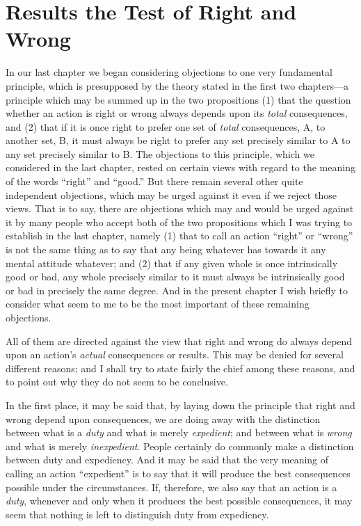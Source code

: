 
\author{G. E. Moore}
\chapter{Results the Test of Right and Wrong}


In our last chapter we began considering objections to one
very fundamental principle, which is presupposed by the theory stated
in the first two chapters---a principle which may be summed up in the
two propositions (1) that the question whether an action is right or
wrong always depends upon its \textit{total} consequences, and (2)
that if it is once right to prefer one set of \textit{total}
consequences, A, to another set, B, it must always be right to
prefer any set precisely similar to A to any set precisely similar to
B. The objections to this principle, which we considered in the last
chapter, rested on certain views with regard to the meaning of the
words ``right'' and ``good.'' But there remain several other quite
independent objections, which may be urged against it  even
if we reject those views. That is to say, there are objections which
may and would be urged against it by many people who accept both of
the two propositions which I was trying to establish in the last
chapter, namely (1) that to call an action ``right'' or ``wrong'' is
not the same thing as to say that any being whatever has towards it
any mental attitude whatever; and (2) that if any given whole is once
intrinsically good or bad, any whole precisely similar to it must
always be intrinsically good or bad in precisely the same degree. And
in the present chapter I wish briefly to consider what seem to me to
be the most important of these remaining objections.

All of them are directed against the view that right and wrong do
always depend upon an action's \textit{actual} consequences or
results. This may be denied for several different reasons; and I shall
try to state fairly the chief among these reasons, and to point out
why they do not seem to be conclusive.

In the first place, it may be said that, by laying down the principle
that right and wrong depend upon consequences, we are doing away with
the distinction between  what is a \textit{duty} and what is
merely \textit{expedient}; and between what is \textit{wrong} and what
is merely \textit{inexpedient}. People certainly do commonly make a
distinction between duty and expediency. And it may be said that the
very meaning of calling an action ``expedient'' is to say that it will
produce the best consequences possible under the circumstances. If,
therefore, we also say that an action is a \textit{duty}, whenever and
only when it produces the best possible consequences, it may seem
that nothing is left to distinguish duty from expediency.

